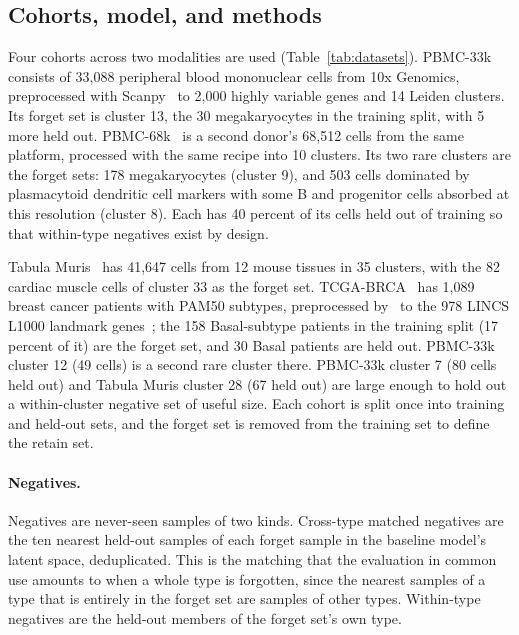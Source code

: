 \documentclass{article}
\begin{document}
\subsection{Cohorts, model, and methods}
\label{sec:datasets}

Four cohorts across two modalities are used (Table~\ref{tab:datasets}). PBMC-33k consists of 33,088 peripheral blood mononuclear cells from 10x Genomics, preprocessed with Scanpy~\citep{wolf2018} to 2,000 highly variable genes and 14 Leiden clusters. Its forget set is cluster 13, the 30 megakaryocytes in the training split, with 5 more held out. PBMC-68k~\citep{zheng2017} is a second donor's 68,512 cells from the same platform, processed with the same recipe into 10 clusters. Its two rare clusters are the forget sets: 178 megakaryocytes (cluster 9), and 503 cells dominated by plasmacytoid dendritic cell markers with some B and progenitor cells absorbed at this resolution (cluster 8). Each has 40 percent of its cells held out of training so that within-type negatives exist by design.

Tabula Muris~\citep{tabula2018} has 41,647 cells from 12 mouse tissues in 35 clusters, with the 82 cardiac muscle cells of cluster 33 as the forget set. TCGA-BRCA~\citep{tcga2012} has 1,089 breast cancer patients with PAM50 subtypes, preprocessed by~\citet{ozturk2026} to the 978 LINCS L1000 landmark genes~\citep{subramanian2017}; the 158 Basal-subtype patients in the training split (17 percent of it) are the forget set, and 30 Basal patients are held out. PBMC-33k cluster 12 (49 cells) is a second rare cluster there. PBMC-33k cluster 7 (80 cells held out) and Tabula Muris cluster 28 (67 held out) are large enough to hold out a within-cluster negative set of useful size. Each cohort is split once into training and held-out sets, and the forget set is removed from the training set to define the retain set.

\begin{table}[t]
\centering
\caption{Cohorts, splits, forget sets, and negatives. Cross-type matched negatives are the ten nearest held-out samples of each forget sample in the baseline model's latent space, deduplicated; within-type negatives are the held-out members of the forget set's own cluster or subtype. Generated from the split and matching files by \texttt{scripts/make\_tex\_tables.py}.}
\label{tab:datasets}
\small
\resizebox{\textwidth}{!}{}
\end{table}

\paragraph{Negatives.} Negatives are never-seen samples of two kinds. Cross-type matched negatives are the ten nearest held-out samples of each forget sample in the baseline model's latent space, deduplicated. This is the matching that the evaluation in common use amounts to when a whole type is forgotten, since the nearest samples of a type that is entirely in the forget set are samples of other types. Within-type negatives are the held-out members of the forget set's own type.
\end{document}
